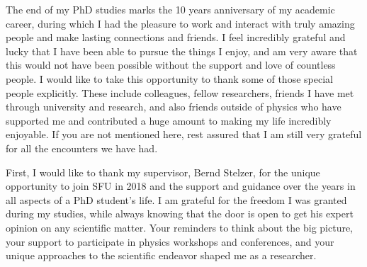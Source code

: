 The end of my PhD studies marks the 10 years anniversary of my academic career, during which I had the pleasure to work and interact with truly amazing people and make lasting connections and friends.
I feel incredibly grateful and lucky that I have been able to pursue the things I enjoy, and am very aware that this would not have been possible without the support and love of countless people. 
I would like to take this opportunity to thank some of those special people explicitly.
These include colleagues, fellow researchers, friends I have met through university and research, and also friends outside of physics who have supported me and contributed a huge amount to making my life incredibly enjoyable. 
If you are not mentioned here, rest assured that I am still very grateful for all the encounters we have had.

First, I would like to thank my supervisor, Bernd Stelzer, for the unique opportunity to join SFU in 2018 and the support and guidance over the years in all aspects of a PhD student's life. 
I am grateful for the freedom I was granted during my studies, while always knowing that the door is open to get his expert opinion on any scientific matter.
Your reminders to think about the big picture, your support to participate in physics workshops and conferences, and your unique approaches to the scientific endeavor shaped me as a researcher. 


